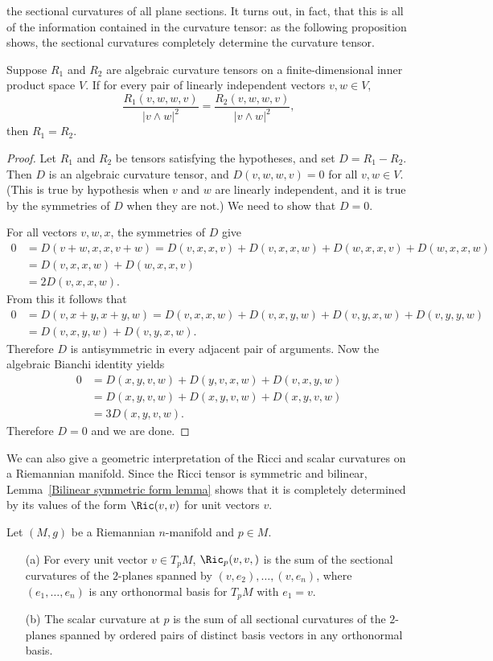 the sectional curvatures of all plane sections. It turns out, in fact, that this is all of the information contained in the curvature tensor: as the following 
proposition shows, the sectional curvatures completely determine the curvature tensor.
\begin{proposition}\label{Riemann sectional curvature determine}
Suppose $R_1$ and $R_2$ are algebraic curvature tensors on a finite-dimensional inner product space $V$. If for every pair of linearly independent vectors $v,w\in V$,
\[\frac{R_1(v,w,w,v)}{|v\wedge w|^2}=\frac{R_2(v,w,w,v)}{|v\wedge w|^2},\]
then $R_1=R_2$.
\end{proposition}
\begin{proof}
Let $R_1$ and $R_2$ be tensors satisfying the hypotheses, and set $D=R_1-R_2$. Then $D$ is an algebraic curvature tensor, and $D(v,w,w,v)=0$ for all $v,w\in V$. (This is 
true by hypothesis when $v$ and $w$ are linearly independent, and it is true by the symmetries of $D$ when they are not.) We need to show that $D=0$.\par
For all vectors $v,w,x$, the symmetries of $D$ give
\begin{align*}
0&=D(v+w,x,x,v+w)=D(v,x,x,v)+D(v,x,x,w)+D(w,x,x,v)+D(w,x,x,w)\\
&=D(v,x,x,w)+D(w,x,x,v)\\
&=2D(v,x,x,w).
\end{align*}
From this it follows that
\begin{align*}
0&=D(v,x+y,x+y,w)=D(v,x,x,w)+D(v,x,y,w)+D(v,y,x,w)+D(v,y,y,w)\\
&=D(v,x,y,w)+D(v,y,x,w).
\end{align*}
Therefore $D$ is antisymmetric in every adjacent pair of arguments. Now the algebraic Bianchi identity yields
\begin{align*}
0&=D(x,y,v,w)+D(y,v,x,w)+D(v,x,y,w)\\
&=D(x,y,v,w)+D(x,y,v,w)+D(x,y,v,w)\\
&=3D(x,y,v,w).
\end{align*}
Therefore $D=0$ and we are done.
\end{proof}
We can also give a geometric interpretation of the Ricci and scalar curvatures on a Riemannian manifold. Since the Ricci tensor is symmetric and bilinear, Lemma~\ref{Bilinear symmetric form lemma} 
shows that it is completely determined by its values of the form $\Ric(v,v)$ for unit vectors $v$.
\begin{proposition}\label{Riemann Ric scalar curvature interpretation}
Let $(M,g)$ be a Riemannian $n$-manifold and $p\in M$.
\begin{itemize}
\item[(a)] For every unit vector $v\in T_pM$, $\Ric_p(v,v,)$ is the sum of the sectional curvatures of the $2$-planes spanned by $(v,e_2),\dots,(v,e_n)$, where $(e_1,\dots,e_n)$ 
is any orthonormal basis for $T_pM$ with $e_1=v$.
\item[(b)] The scalar curvature at $p$ is the sum of all sectional curvatures of the $2$-planes spanned by ordered pairs of distinct basis vectors in any orthonormal basis.
\end{itemize}
\end{proposition}
